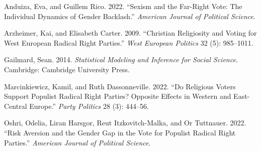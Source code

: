 \documentclass[
]{article}
\newlength{\cslhangindent}
\newlength{\cslentryspacingunit} %
\newenvironment{CSLReferences}[2] %
 {%
  \setlength{\parindent}{0pt}
  \ifodd #1
  \let\oldpar\par
  \def\par{\hangindent=\cslhangindent\oldpar}
  \fi
  \setlength{\parskip}{#2\cslentryspacingunit}
 }%
 {}
\begin{document}
\hypertarget{refs}{}
\begin{CSLReferences}{1}{0}
\leavevmode{}%
Anduiza, Eva, and Guillem Rico. 2022. {``Sexism and the Far-Right Vote:
The Individual Dynamics of Gender Backlash.''} \emph{American Journal of
Political Science}.

\leavevmode{}%
Arzheimer, Kai, and Elisabeth Carter. 2009. {``Christian Religiosity and
Voting for West European Radical Right Parties.''} \emph{West European
Politics} 32 (5): 985--1011.

\leavevmode{}%
Gailmard, Sean. 2014. \emph{Statistical {Modeling} and {Inference} for
{Social} {Science}}. Cambridge: Cambridge University Press.

\leavevmode{}%
Marcinkiewicz, Kamil, and Ruth Dassonneville. 2022. {``Do Religious
Voters Support Populist Radical Right Parties? Opposite Effects in
Western and East-Central Europe.''} \emph{Party Politics} 28 (3):
444--56.

\leavevmode{}%
Oshri, Odelia, Liran Harsgor, Reut Itzkovitch-Malka, and Or Tuttnauer.
2022. {``Risk Aversion and the Gender Gap in the Vote for Populist
Radical Right Parties.''} \emph{American Journal of Political Science}.

\end{CSLReferences}
\end{document}

